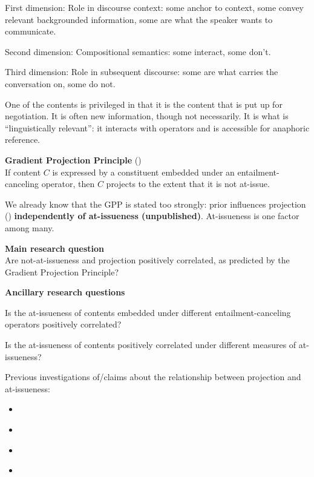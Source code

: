\documentclass[11pt,fleqn]{article}
\newcommand{\6}{\mbox{$[\hspace*{-.6mm}[$}}
\newcommand{\9}{\mbox{$]\hspace*{-.6mm}]$}}
\begin{document}
First dimension: Role in discourse context: some anchor to context, some convey relevant backgrounded information, some are what the speaker wants to communicate.

Second dimension: Compositional semantics: some interact, some don't.

Third dimension: Role in subsequent discourse: some are what carries the conversation on, some do not.


One of the contents is privileged in that it is the content that is put up for negotiation. It is often new information, though not necessarily. It is what is ``linguistically relevant'': it interacts with operators and is accessible for anaphoric reference.


\begin{exe}
\ex\label{gpp} {\bf Gradient Projection Principle} \hfill (\citealt[400]{tbd-variability}) \\ If content $C$ is expressed by a constituent embedded under an entailment-canceling operator, then $C$ projects to the extent that it is not at-issue.
\end{exe}

We already know that the GPP is stated too strongly: prior influences projection (\citealt{degen-tonhauser-openmind}) {\bf independently of at-issueness (unpublished)}. At-issueness is one factor among many.


\begin{exe}
\ex\label{rqs} {\bf Main research question} \\
Are not-at-issueness and projection positively correlated, as predicted by the Gradient Projection Principle?
\end{exe}

\begin{exe}
\ex\label{rqs} {\bf Ancillary research questions}
\begin{xlist}

\ex Is the at-issueness of contents embedded under different entailment-canceling operators positively correlated?

\ex Is the at-issueness of contents positively correlated under different measures of at-issueness?
\end{xlist}
\end{exe}


Previous investigations of/claims about the relationship between projection and at-issueness:

\begin{itemize}

\item \citealt{brst-salt10,brst-ar}

\item \citealt{xue-onea11}

\item \citealt{tbd-variability}

\item \citealt{koev2018}

\end{itemize}
\end{document}
